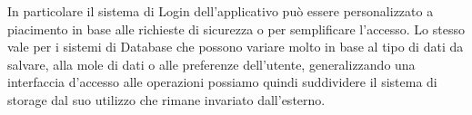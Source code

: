 \documentclass[12pt]{scrartcl}
\begin{document}
In particolare il sistema di Login dell'applicativo pu\`o essere personalizzato a
piacimento in base alle richieste di sicurezza o per semplificare l'accesso.
Lo stesso vale per i sistemi di Database che possono variare molto in base al tipo
di dati da salvare, alla mole di dati o alle preferenze dell'utente, generalizzando
una interfaccia d'accesso alle operazioni possiamo quindi suddividere il sistema
di storage dal suo utilizzo che rimane invariato dall'esterno.
\end{document}
